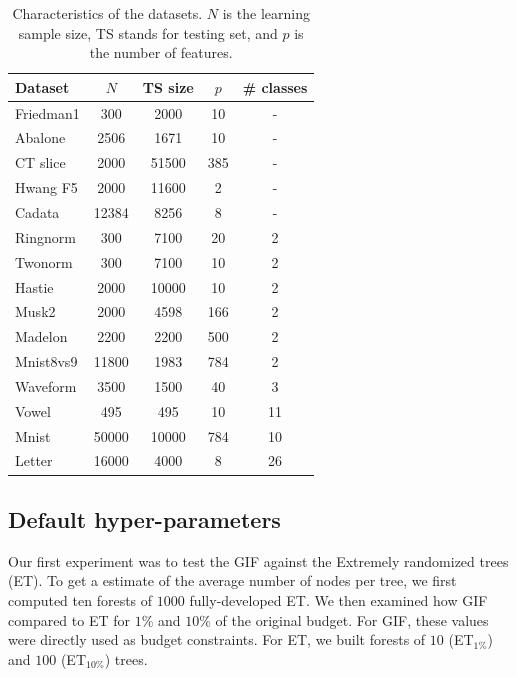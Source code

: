 \documentclass{article}
\begin{document}
\begin{table}[t]
\caption{Characteristics of the datasets. $N$ is the learning sample size, TS 
stands for testing set, and $p$ is the number of features.}
\label{tab:datasets}
\begin{center}
\begin{small}
\begin{sc}
\begin{tabular}{l|cccc}
\hline
Dataset & $N$ & TS size & $p$ & \# classes\\
\hline
Friedman1 & 300 & 2000 & 10 & - \\
Abalone & 2506 & 1671 & 10 & - \\
CT slice & 2000 & 51500 & 385 & - \\
Hwang F5 & 2000 & 11600 & 2 & - \\
Cadata & 12384 & 8256 & 8 & - \\
Ringnorm & 300 & 7100 & 20 & 2 \\
Twonorm & 300 & 7100 & 10 & 2 \\
Hastie & 2000 & 10000 & 10 & 2 \\
Musk2 & 2000 & 4598 & 166 & 2 \\
Madelon & 2200 & 2200 & 500 & 2 \\
Mnist8vs9 & 11800 & 1983 & 784 & 2 \\
Waveform & 3500 & 1500 & 40 & 3 \\
Vowel & 495 & 495 & 10 & 11 \\
Mnist & 50000 & 10000 & 784 & 10 \\
Letter & 16000 & 4000 & 8 & 26 \\
\hline
\end{tabular}
\end{sc}
\end{small}
\end{center}
\vskip -0.2in
\end{table}

\subsection{Default hyper-parameters}
\label{subsec:defaultHP}

Our first experiment was to test the GIF against the Extremely randomized trees 
(ET). To get a estimate of the average number of nodes per tree, we first 
computed ten forests of $1000$ fully-developed ET. We then examined how GIF 
compared to ET for $1\%$ and $10\%$ of the original budget. For GIF, these 
values were directly used as budget constraints. For ET, we built forests of 
$10$ (ET$_{1\%}$) and $100$ (ET$_{10\%}$) trees. 
\end{document}
